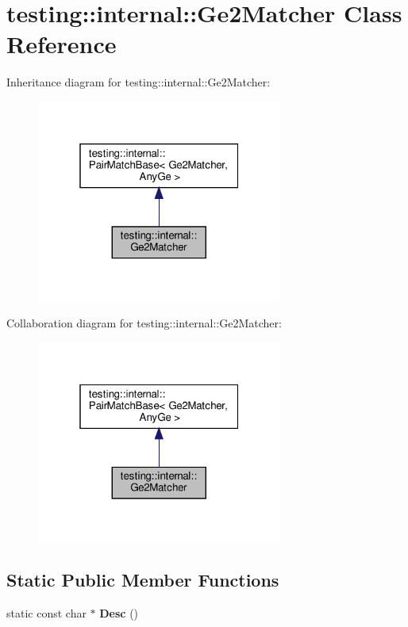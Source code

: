 \hypertarget{classtesting_1_1internal_1_1_ge2_matcher}{}\section{testing\+:\+:internal\+:\+:Ge2\+Matcher Class Reference}
\label{classtesting_1_1internal_1_1_ge2_matcher}


Inheritance diagram for testing\+:\+:internal\+:\+:Ge2\+Matcher\+:
\nopagebreak
\begin{figure}[H]
\begin{center}
\leavevmode
\includegraphics[width=229pt]{classtesting_1_1internal_1_1_ge2_matcher__inherit__graph}
\end{center}
\end{figure}


Collaboration diagram for testing\+:\+:internal\+:\+:Ge2\+Matcher\+:
\nopagebreak
\begin{figure}[H]
\begin{center}
\leavevmode
\includegraphics[width=229pt]{classtesting_1_1internal_1_1_ge2_matcher__coll__graph}
\end{center}
\end{figure}
\subsection*{Static Public Member Functions}
\begin{DoxyCompactItemize}
\item 
\mbox{\label{classtesting_1_1internal_1_1_ge2_matcher_a29fa53bdfa6778b709eaef017aeea855}} 
static const char $\ast$ {\bfseries Desc} ()
\end{DoxyCompactItemize}
